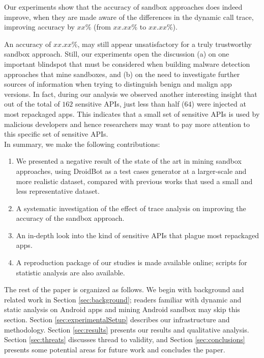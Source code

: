 Our experiments show that the accuracy of sandbox approaches does indeed improve, when they are made aware of the differences in the dynamic call trace, improving accuracy by $xx\%$ (from $xx.xx\%$ to $xx.xx\%$). 

An accuracy of $xx.xx\%$, may still appear unsatisfactory for a truly trustworthy sandbox approach. Still, 
our experiments open the discussion (a) on one important blindspot that must be considered when building 
malware detection approaches that mine sandboxes, and (b) on the need to investigate further sources of information when trying to distinguish benign and malign app versions. 
In fact, during our analysis we observed another interesting insight that out of the total of $162$ sensitive APIs, just less than half ($64$) were injected at most repackaged apps. 
This indicates that a small set of sensitive APIs is used by malicious developers and hence 
researchers may want to pay more attention to this specific set of sensitive APIs.\\

\noindent
In summary, we make the following contributions:

\begin{enumerate}[1.]
\item We presented a negative result of the state of the art in mining sandbox approaches, using DroidBot as a test cases generator at a larger-scale and more realistic dataset, compared with previous works that used a small and less representative dataset.
\item A systematic investigation of the effect of trace analysis on improving the accuracy of the sandbox approach.
\item An in-depth look into the kind of sensitive APIs that plague most repackaged apps.
\item A reproduction package of our studies is made available online; scripts for statistic analysis are also available.%
\end{enumerate}

The rest of the paper is organized as follows. We begin with background and related work in Section \ref{sec:background};
readers familiar with dynamic and static analysis on Android apps and mining Android sandbox may skip this section.
Section \ref{sec:experimentalSetup} describes our infrastructure and methodology. Section \ref{sec:results} presents our results and qualitative analysis. Section \ref{sec:threats} discusses thread to validity, and Section \ref{sec:conclusions} 
presents some potential areas for future work and concludes the paper.
